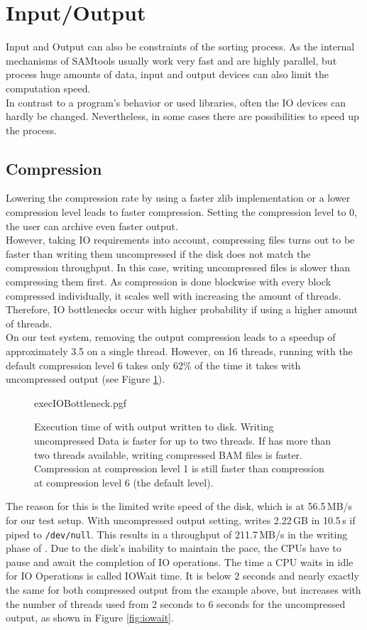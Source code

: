 \section{Input/Output} 
Input and Output can also be constraints of the sorting process. As the internal mechanisms of SAMtools usually work very fast and are highly parallel, but process huge amounts of data, input and output devices can also limit the computation speed. \\
In contrast to a program's behavior or used libraries, often the IO devices can hardly be changed. Nevertheless, in some cases there are possibilities to speed up the process.

\subsection{Compression}
Lowering the compression rate by using a faster zlib implementation or a lower compression level leads to faster compression. Setting the compression level to 0, the user can archive even faster output. \\
However, taking IO requirements into account, compressing files turns out to be faster than writing them uncompressed if the disk does not match the compression throughput. In this case, writing uncompressed files is slower than compressing them first. As compression is done blockwise with every block compressed individually, it scales well with increasing the amount of threads. Therefore, IO bottlenecks occur with higher probability if using a higher amount of threads. \\
On our test system, removing the output compression leads to a speedup of approximately 3.5 on a single thread. However, on 16 threads, running \sort with the default compression level 6 takes only 62\% of the time it takes with uncompressed output (see Figure \ref{fig:execIO}). \\
\begin{figure}[t]
        {execIOBottleneck.pgf}
    \caption{Execution time of \sort with output written to disk. Writing uncompressed Data is faster for up to two threads. If \sort has more than two threads available, writing compressed BAM files is faster. Compression at compression level 1 is still faster than compression at compression level 6 (the default level). \f@size}
    \label{fig:execIO}
\end{figure}
The reason for this is the limited write speed of the disk, which is at 56.5\,MB/s for our test setup. With uncompressed output setting, \sort writes 2.22\,GB in 10.5\,s if piped to \texttt{/dev/null}. This results in a throughput of 211.7\,MB/s in the writing phase of \sort. Due to the disk's inability to maintain the pace, the CPUs have to pause and await the completion of IO operations. The time a CPU waits in idle for IO Operations is called IOWait time. It is below 2 seconds and nearly exactly the same for both compressed output from the example above, but increases with the number of threads used from 2 seconds to 6 seconds for the uncompressed output, as shown in Figure \ref{fig:iowait}.
